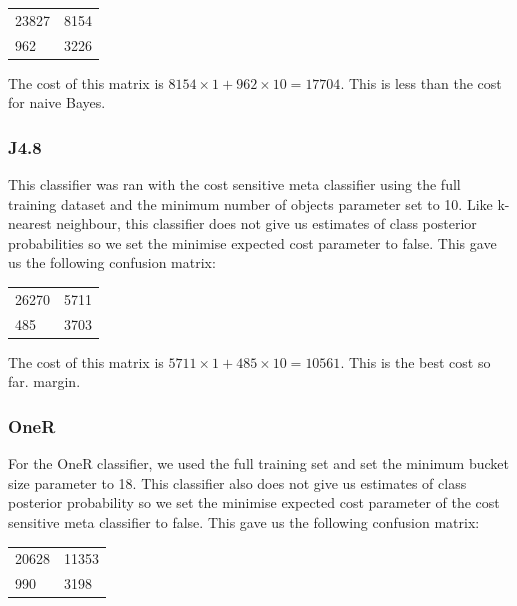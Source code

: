 \documentclass[a4paper,11pt]{article}
\begin{document}
\begin{table}[H]
  \begin{center}
    \begin{tabular}{l l }
      23827 & 8154 \\
      962 & 3226 \\
    \end{tabular}
  \end{center}
  \label{tab:kNNCost}
\end{table}

The cost of this matrix is $ 8154 \times 1 + 962 \times 10 = 17704 $. This is less than the cost for naive Bayes.

\subsubsection{J4.8}
This classifier was ran with the cost sensitive meta classifier using the full training dataset and the minimum
number of objects parameter set to 10. Like k-nearest neighbour, this classifier does not give us estimates of
class posterior probabilities so we set the minimise expected cost parameter to false. This gave us the following
confusion matrix:

\begin{table}[H]
  \begin{center}
    \begin{tabular}{l l }
      26270 & 5711 \\
      485 & 3703 \\
    \end{tabular}
  \end{center}
  \label{tab:J48Cost}
\end{table}

The cost of this matrix is $ 5711 \times 1 + 485 \times 10 = 10561 $. This is the best cost so far.
margin.

\subsubsection{OneR}
For the OneR classifier, we used the full training set and set the minimum bucket size parameter to 18. This
classifier also does not give us estimates of class posterior probability so we set the minimise expected cost
parameter of the cost sensitive meta classifier to false. This gave us the following confusion matrix:

\begin{table}[H]
  \begin{center}
    \begin{tabular}{l l }
      20628 & 11353 \\
      990 & 3198 \\
    \end{tabular}
  \end{center}
  \label{tab:OneRCost}
\end{table}
\end{document}
